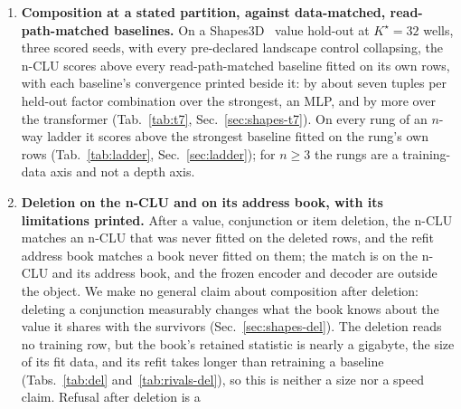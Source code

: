 \documentclass{article} %
\newcommand{\Kstar}{\ensuremath{K^{\star}}}
\begin{document}
\begin{enumerate}
\item \textbf{Composition at a stated partition, against data-matched, read-path-matched baselines.} On a
  Shapes3D~\citep{3dshapes18,kim_disentangling_2019} value hold-out at $\Kstar=32$ wells, three scored seeds, with every %
  pre-declared landscape control collapsing, the n-CLU scores above every read-path-matched baseline
  fitted on its own rows, with each baseline's convergence printed beside it: by about seven tuples %
  per held-out factor combination over the strongest, an MLP, and by more over the transformer %
  (Tab.~\ref{tab:t7}, Sec.~\ref{sec:shapes-t7}). On every rung of an $n$-way ladder it %
  scores above the strongest baseline fitted on the rung's own rows %
  (Tab.~\ref{tab:ladder}, Sec.~\ref{sec:ladder}); for $n\ge3$ the rungs are a training-data axis and not a depth axis.
\item \textbf{Deletion on the n-CLU and on its address book, with its limitations printed.} After
  a value, conjunction or item deletion, the n-CLU matches an n-CLU that was never fitted on the deleted
  rows, and the refit address book matches a book never fitted on them; the match is on the n-CLU and
  its address book, and the frozen encoder and decoder are outside the object. We make no general claim
  about composition after deletion: deleting a conjunction measurably changes what the book knows %
  about the value it shares with the survivors (Sec.~\ref{sec:shapes-del}). The deletion reads no
  training row, but the book's retained statistic is nearly a gigabyte, the size of its fit data, and its refit %
  takes longer than retraining a baseline (Tabs.~\ref{tab:del} and~\ref{tab:rivals-del}), so this is neither a size nor a speed claim. Refusal after deletion is a %

\end{enumerate}
\end{document}
